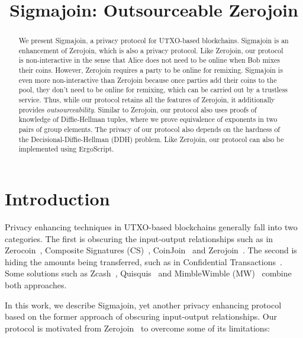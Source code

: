 \documentclass[runningheads]{llncs}
\newcommand{\ergoscript}{ErgoScript\xspace}
\newcommand{\zerocoin}{Zerocoin\xspace}
\newcommand{\zerojoin}{Zerojoin\xspace}
\begin{document}
\newcommand{\algname}{Sigmajoin\xspace}
\title{\algname: Outsourceable \zerojoin}

\maketitle

\begin{abstract}

We present \algname, a privacy protocol for UTXO-based 
blockchains. \algname is an enhancement of \zerojoin, which is also a privacy protocol. 
Like \zerojoin, our protocol is non-interactive in the sense that Alice does not need to be online when Bob mixes their coins.
However, \zerojoin requires a party to be online for remixing. \algname is even more non-interactive than \zerojoin because
once parties add  their coins to the pool, they don't need to be online for remixing, which can be carried out by a trustless service.
Thus, while our protocol retains all the features of \zerojoin, it additionally provides {\em outsourceability}. Similar to \zerojoin, our protocol also uses proofs of knowledge of Diffie-Hellman tuples, where we prove equivalence of exponents in two pairs of group elements. The privacy of our protocol also depends on the hardness of the Decisional-Diffie-Hellman (DDH) problem. Like \zerojoin, our protocol can also be implemented using \ergoscript.
\end{abstract}

\section{Introduction}
\label{intro}


Privacy enhancing techniques in UTXO-based blockchains generally fall into two categories. The first is obscuring the input-output relationships such as in \zerocoin~\cite{zerocoin}, Composite Signatures (CS)~\cite{composite}, CoinJoin~\cite{coinjoin} and \zerojoin~\cite{zerojoin}. The second is hiding the amounts being transferred, such as in Confidential Transactions~\cite{ct}. Some solutions such as Zcash~\cite{zcash,zcash1}, Quisquis~\cite{quisquis} and MimbleWimble (MW)~\cite{mw} combine both approaches.

In this work, we describe \algname, yet another privacy enhancing protocol based on the former approach of obscuring input-output relationships. Our protocol is motivated from \zerojoin~\cite{zerojoin} to overcome some of its limitations:
\end{document}
